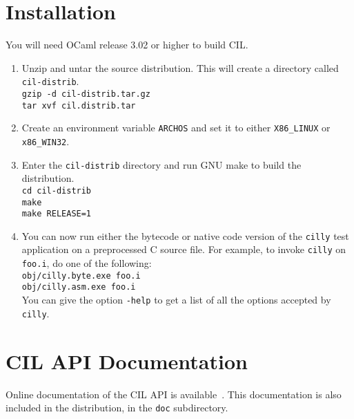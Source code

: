 \documentclass{article}
\newcommand{\hsp}{\hspace{0.5in}}
\newcommand{\t}[1]{{\tt #1}}
\begin{document}
\section{Installation}

You will need OCaml release 3.02 or higher to build CIL. 

\begin{enumerate}
\item Unzip and untar the source distribution. This will create a directory
      called \t{cil-distrib}. \\
      \hsp\verb!gzip -d cil-distrib.tar.gz!\\
      \hsp\verb!tar xvf cil.distrib.tar!
\item Create an environment variable \t{ARCHOS} and set it to either
      \t{X86\_LINUX} or \t{x86\_WIN32}.
\item Enter the \t{cil-distrib} directory and run GNU make to build the 
      distribution.\\
      \hsp\verb!cd cil-distrib!\\
      \hsp\verb!make!\\
      \hsp\verb!make RELEASE=1!\\

\item You can now run either the bytecode or native code version of the
      \t{cilly} test application on a preprocessed C source file. For example,
      to invoke \t{cilly} on \t{foo.i}, do one of the following:\\
      \hsp\verb!obj/cilly.byte.exe foo.i!\\
      \hsp\verb!obj/cilly.asm.exe foo.i!\\
      You can give the option \verb!-help! to get a list of all
      the options accepted by \t{cilly}.
\end{enumerate}

\section{CIL API Documentation} 
Online documentation of the CIL API is available~. This
documentation is also included in the distribution, in the \t{doc}
subdirectory. 
\end{document}
